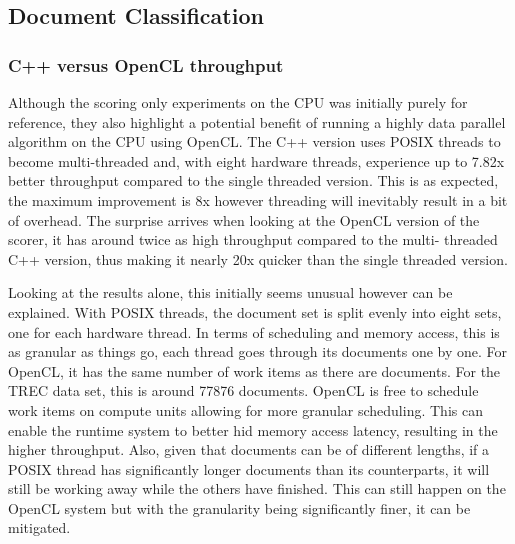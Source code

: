 \subsection{Document Classification}

\subsubsection{C++ versus OpenCL throughput}

Although the scoring only experiments on the CPU was initially purely for
reference, they also highlight a potential benefit of running a highly data
parallel algorithm on the CPU using OpenCL. The C++ version uses POSIX threads
to become multi-threaded and, with eight hardware threads, experience up to
7.82x better throughput compared to the single threaded version. This is as
expected, the maximum improvement is 8x however threading will inevitably result
in a bit of overhead. The surprise arrives when looking at the OpenCL version of
the scorer, it has around twice as high throughput compared to the multi-
threaded C++ version, thus making it nearly 20x quicker than the single threaded
version.

Looking at the results alone, this initially seems unusual however can be
explained. With POSIX threads, the document set is split evenly into eight sets,
one for each hardware thread. In terms of scheduling and memory access, this is
as granular as things go, each thread goes through its documents one by one. For
OpenCL, it has the same number of work items as there are documents. For the
TREC data set, this is around 77876 documents. OpenCL is free to schedule work
items on compute units allowing for more granular scheduling. This can enable
the runtime system to better hid memory access latency, resulting in the higher
throughput. Also, given that documents can be of different lengths, if a POSIX
thread has significantly longer documents than its counterparts, it will still
be working away while the others have finished. This can still happen on the
OpenCL system but with the granularity being significantly finer, it can be
mitigated.
